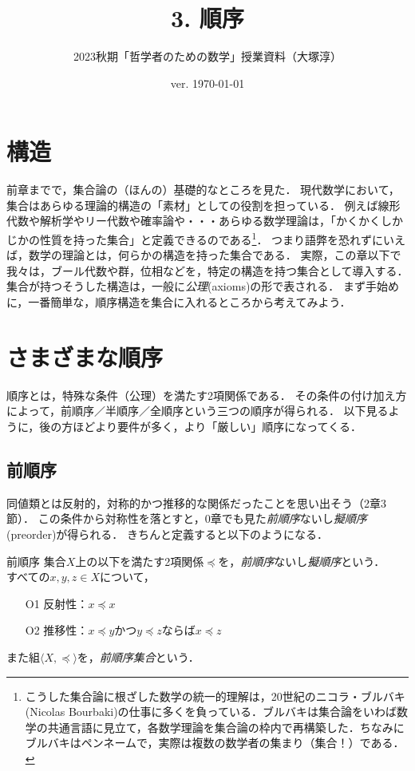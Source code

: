 \documentclass[11pt,a4paper]{jsarticle}
\begin{document}
\title{3. 順序}
\author{2023秋期「哲学者のための数学」授業資料（大塚淳）}
\date{ver. \today}
\maketitle

\section{構造}
前章までで，集合論の（ほんの）基礎的なところを見た．
現代数学において，集合はあらゆる理論的構造の「素材」としての役割を担っている．
例えば線形代数や解析学やリー代数や確率論や・・・あらゆる数学理論は，「かくかくしかじかの性質を持った集合」と定義できるのである\footnote{こうした集合論に根ざした数学の統一的理解は，20世紀のニコラ・ブルバキ(Nicolas Bourbaki)の仕事に多くを負っている．ブルバキは集合論をいわば数学の共通言語に見立て，各数学理論を集合論の枠内で再構築した．ちなみにブルバキはペンネームで，実際は複数の数学者の集まり（集合！）である．}．
つまり語弊を恐れずにいえば，数学の理論とは，何らかの構造を持った集合である．
実際，この章以下で我々は，ブール代数や群，位相などを，特定の構造を持つ集合として導入する．
集合が持つそうした構造は，一般に\emph{公理}(axioms)の形で表される．
まず手始めに，一番簡単な，順序構造を集合に入れるところから考えてみよう．


\section{さまざまな順序}
順序とは，特殊な条件（公理）を満たす2項関係である．
その条件の付け加え方によって，前順序／半順序／全順序という三つの順序が得られる．
以下見るように，後の方ほどより要件が多く，より「厳しい」順序になってくる．


\subsection{前順序}
同値類とは反射的，対称的かつ推移的な関係だったことを思い出そう（2章3節）．
この条件から対称性を落とすと，0章でも見た\emph{前順序}ないし\emph{擬順序}(preorder)が得られる．
きちんと定義すると以下のようになる．

\begin{itembox}[l]{前順序}
集合$X$上の以下を満たす2項関係$\preceq$を，\emph{前順序}ないし\emph{擬順序}という．\\
すべての$x, y, z\in X$について，
\begin{itemize}
 \item[O1] 反射性：$x \preceq x$
 \item[O2] 推移性：$x \preceq y$かつ$y \preceq z$ならば$x \preceq z$
\end{itemize}
また組$\langle X, \preceq \rangle$を，\emph{前順序集合}という． 
\end{itembox}
\end{document}

